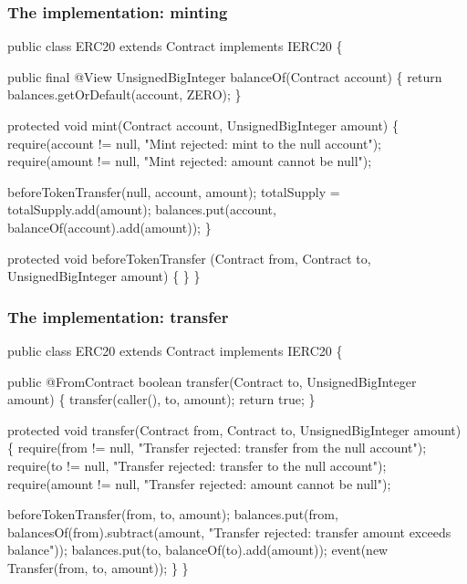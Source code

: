 \documentclass[11pt]{beamer}  %
\def\codesize{\smaller}
\def\<#1>{\codeid{#1}}
\newcommand{\codeid}[1]{\ifmmode{\mbox{\codesize\ttfamily{#1}}}\else{\codesize\ttfamily #1}\fi}
\begin{document}
\begin{frame}[fragile]\frametitle{The \<ERC20> implementation: minting}

{\scriptsize\begin{semiverbatim}
public class ERC20 {\color{red}extends Contract implements IERC20} \{

  public final {\color{red}@View} UnsignedBigInteger balanceOf(Contract account) \{
    return balances.getOrDefault(account, ZERO);
  \}

  protected void mint(Contract account, UnsignedBigInteger amount) \{
    {\color{armygreen}require(account != null, "Mint rejected: mint to the null account");
    require(amount != null, "Mint rejected: amount cannot be null");}

    beforeTokenTransfer(null, account, amount);
    totalSupply = totalSupply.add(amount);
    balances.put(account, balanceOf(account).add(amount));
  \}

  protected void beforeTokenTransfer
      (Contract from, Contract to, UnsignedBigInteger amount) \{ \}
\}
\end{semiverbatim}}

\end{frame}

\begin{frame}[fragile]\frametitle{The \<ERC20> implementation: transfer}

{\scriptsize\begin{semiverbatim}
public class ERC20 {\color{red}extends Contract implements IERC20} \{

  public {\color{red}@FromContract} boolean transfer(Contract to, UnsignedBigInteger amount) \{
    transfer(caller(), to, amount);
    return true;
  \}

  protected void transfer(Contract from, Contract to, UnsignedBigInteger amount) \{
    {\color{armygreen}require(from != null, "Transfer rejected: transfer from the null account");
    require(to != null, "Transfer rejected: transfer to the null account");
    require(amount != null, "Transfer rejected: amount cannot be null");}

    beforeTokenTransfer(from, to, amount);
    balances.put(from, balancesOf(from).subtract(amount,
      {\color{armygreen}"Transfer rejected: transfer amount exceeds balance"}));
    balances.put(to, balanceOf(to).add(amount));
    {\color{red}event(new Transfer(from, to, amount));}
  \}
\}
\end{semiverbatim}}

\end{frame}
\end{document}
